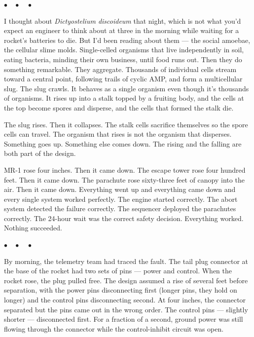 \documentclass[12pt, letterpaper]{article}
\begin{document}
\begin{center}
$\bullet\quad\bullet\quad\bullet$
\end{center}

I thought about \textit{Dictyostelium discoideum} that night, which is not what you'd expect an engineer to think about at three in the morning while waiting for a rocket's batteries to die. But I'd been reading about them --- the social amoebae, the cellular slime molds. Single-celled organisms that live independently in soil, eating bacteria, minding their own business, until food runs out. Then they do something remarkable. They aggregate. Thousands of individual cells stream toward a central point, following trails of cyclic AMP, and form a multicellular slug. The slug crawls. It behaves as a single organism even though it's thousands of organisms. It rises up into a stalk topped by a fruiting body, and the cells at the top become spores and disperse, and the cells that formed the stalk die.

The slug rises. Then it collapses. The stalk cells sacrifice themselves so the spore cells can travel. The organism that rises is not the organism that disperses. Something goes up. Something else comes down. The rising and the falling are both part of the design.

MR-1 rose four inches. Then it came down. The escape tower rose four hundred feet. Then it came down. The parachute rose sixty-three feet of canopy into the air. Then it came down. Everything went up and everything came down and every single system worked perfectly. The engine started correctly. The abort system detected the failure correctly. The sequencer deployed the parachutes correctly. The 24-hour wait was the correct safety decision. Everything worked. Nothing succeeded.

\begin{center}
$\bullet\quad\bullet\quad\bullet$
\end{center}

By morning, the telemetry team had traced the fault. The tail plug connector at the base of the rocket had two sets of pins --- power and control. When the rocket rose, the plug pulled free. The design assumed a rise of several feet before separation, with the power pins disconnecting first (longer pins, they hold on longer) and the control pins disconnecting second. At four inches, the connector separated but the pins came out in the wrong order. The control pins --- slightly shorter --- disconnected first. For a fraction of a second, ground power was still flowing through the connector while the control-inhibit circuit was open.
\end{document}
